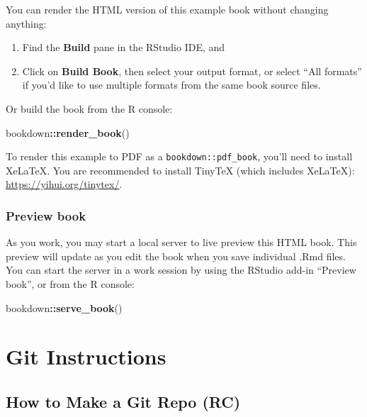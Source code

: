 \documentclass[
]{book}
\newenvironment{Shaded}{\begin{snugshade}}{\end{snugshade}}
\newcommand{\FunctionTok}[1]{\textcolor[rgb]{0.13,0.29,0.53}{\textbf{#1}}}
\newcommand{\NormalTok}[1]{#1}
\newcommand{\SpecialCharTok}[1]{\textcolor[rgb]{0.81,0.36,0.00}{\textbf{#1}}}
\theoremstyle{definition}
\theoremstyle{definition}
\theoremstyle{definition}
\theoremstyle{definition}
\theoremstyle{remark}
\begin{document}
You can render the HTML version of this example book without changing anything:

\begin{enumerate}
\def\labelenumi{\arabic{enumi}.}
\item
  Find the \textbf{Build} pane in the RStudio IDE, and
\item
  Click on \textbf{Build Book}, then select your output format, or select ``All formats'' if you'd like to use multiple formats from the same book source files.
\end{enumerate}

Or build the book from the R console:

\begin{Shaded}
\begin{Highlighting}[]
\NormalTok{bookdown}\SpecialCharTok{::}\FunctionTok{render\_book}\NormalTok{()}
\end{Highlighting}
\end{Shaded}

To render this example to PDF as a \texttt{bookdown::pdf\_book}, you'll need to install XeLaTeX. You are recommended to install TinyTeX (which includes XeLaTeX): \url{https://yihui.org/tinytex/}.

\subsection{Preview book}\label{preview-book}

As you work, you may start a local server to live preview this HTML book. This preview will update as you edit the book when you save individual .Rmd files. You can start the server in a work session by using the RStudio add-in ``Preview book'', or from the R console:

\begin{Shaded}
\begin{Highlighting}[]
\NormalTok{bookdown}\SpecialCharTok{::}\FunctionTok{serve\_book}\NormalTok{()}
\end{Highlighting}
\end{Shaded}

\chapter{Git Instructions}\label{git-instructions}

\section{How to Make a Git Repo (RC)}\label{how-to-make-a-git-repo-rc}
\end{document}
